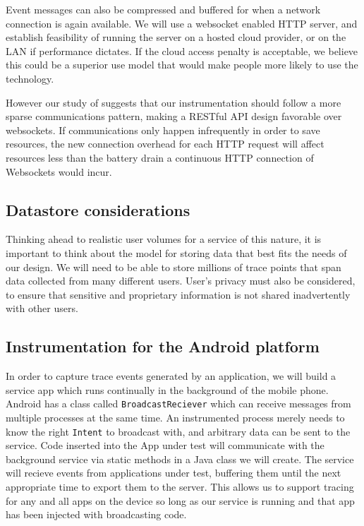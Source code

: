 \documentclass{acm_proc_article-sp}
\begin{document}
Event messages can also be compressed and buffered for when a 
network connection is again available. We will use a websocket enabled HTTP 
server, and establish feasibility of running the server on a hosted cloud 
provider, or on the LAN if performance dictates. If the cloud access penalty is 
acceptable, we believe this could be a superior use model that would make people
more likely to use the technology. 

However our study of \cite{PeriodicTransfers} suggests that
our instrumentation should follow a more sparse communications pattern, making
a RESTful API\cite{REST} design favorable over websockets. If communications
only happen infrequently in order to save resources, the new connection overhead for
each HTTP request will affect resources less than the battery
drain a continuous HTTP connection of Websockets would incur.

\subsection{Datastore considerations}
Thinking ahead to realistic user volumes for a service of this nature, it is
important to think about the model for storing data that best fits the 
needs of our design. We will need to be able to store millions of trace points
that span data collected from many different users. User's privacy must also be
considered, to ensure that sensitive and proprietary information is not shared
inadvertently with other users.

\subsection{Instrumentation for the Android platform}
In order to capture trace events generated by an application, we will build
a service app which runs continually in the background of the mobile phone.
Android has a class called \texttt{BroadcastReciever} which can receive messages
from multiple processes at the same time. An instrumented process merely needs
to know the right \texttt{Intent} to broadcast with, and arbitrary data can be
sent to the service. Code inserted into the App under test will communicate with the
background service via static methods in a Java class we will create.
The service will recieve events from applications under test, buffering them until the
next appropriate time to export them to the server. This allows us to support 
tracing for any and all apps on the device so long as our service is running and 
that app has been injected with broadcasting code.
\end{document}
